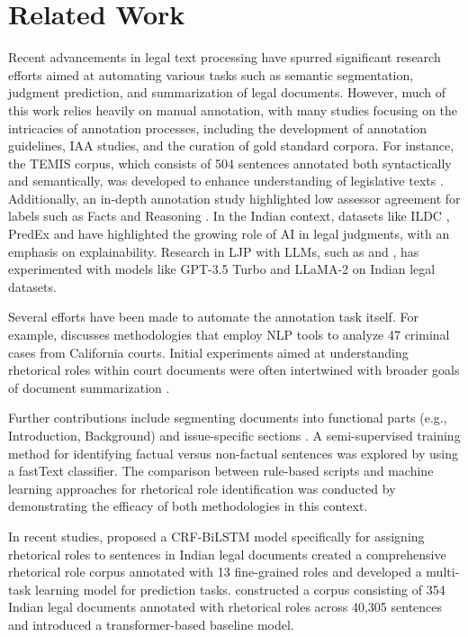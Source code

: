 \section{Related Work}
Recent advancements in legal text processing have spurred significant research efforts aimed at automating various tasks such as semantic segmentation, judgment prediction, and summarization of legal documents. However, much of this work relies heavily on manual annotation, with many studies focusing on the intricacies of annotation processes, including the development of annotation guidelines, IAA studies, and the curation of gold standard corpora. For instance, the TEMIS corpus, which consists of 504 sentences annotated both syntactically and semantically, was developed to enhance understanding of legislative texts \citet{venturi2012design}. Additionally, an in-depth annotation study highlighted low assessor agreement for labels such as Facts and Reasoning \citet{wyner2013case}. In the Indian context, datasets like ILDC \citet{malik-etal-2021-ildc}, PredEx \citet{nigam-etal-2024-legal} and \citet{nigam2022nigam, malik-etal-2022-semantic, nigam2023nonet, nigam2023legal} have highlighted the growing role of AI in legal judgments, with an emphasis on explainability. Research in LJP with LLMs, such as \citet{vats2023llms} and \citet{nigam-etal-2024-legal}, has experimented with models like GPT-3.5 Turbo and LLaMA-2 on Indian legal datasets. 

Several efforts have been made to automate the annotation task itself. For example, \citet{wyner2010towards} discusses methodologies that employ NLP tools to analyze 47 criminal cases from California courts. Initial experiments aimed at understanding rhetorical roles within court documents were often intertwined with broader goals of document summarization \citet{saravanan2008automatic}. 

Further contributions include segmenting documents into functional parts (e.g., Introduction, Background) and issue-specific sections \citet{vsavelka2018segmenting}. A semi-supervised training method for identifying factual versus non-factual sentences was explored by \citet{nejadgholi2017semi} using a fastText classifier. The comparison between rule-based scripts and machine learning approaches for rhetorical role identification was conducted by \citet{walker2019automatic} demonstrating the efficacy of both methodologies in this context.

In recent studies, \citet{bhattacharya2019identification} proposed a CRF-BiLSTM model specifically for assigning rhetorical roles to sentences in Indian legal documents \citet{bhattacharya2019identification, malik-etal-2022-semantic} created a comprehensive rhetorical role corpus annotated with 13 fine-grained roles and developed a multi-task learning model for prediction tasks. \citet{kalamkar-etal-2022-corpus} constructed a corpus consisting of 354 Indian legal documents annotated with rhetorical roles across 40,305 sentences and introduced a transformer-based baseline model.

